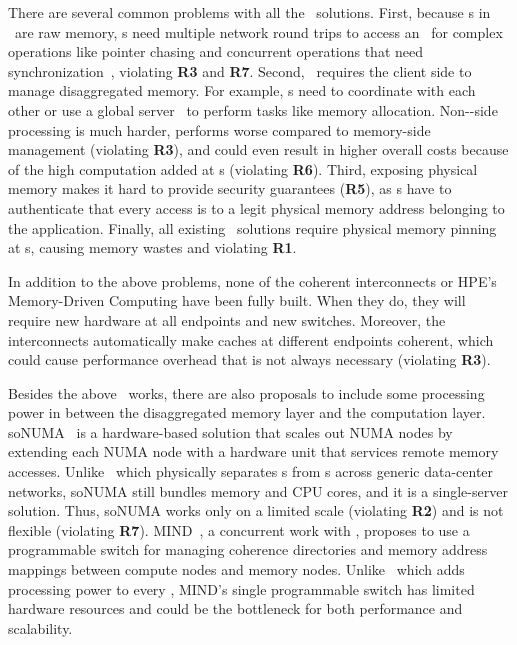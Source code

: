 There are several common problems with all the \pdm\ solutions.
First, because \MN{}s in \pdm\ are raw memory, \CN{}s need multiple network round trips to access an \MN\ 
for complex operations like pointer chasing and concurrent operations that need synchronization~\cite{Tsai20-ATC}, violating \textbf{R3} and \textbf{R7}.
Second, \pdm\ requires the client side to manage disaggregated memory.
For example, \CN{}s need to coordinate with each other or use a global server~\cite{Tsai20-ATC} to perform tasks like memory allocation.
Non-\MN-side processing is much harder, performs worse compared to memory-side management (violating \textbf{R3}), and could even result in higher overall costs because of the high computation added at \CN{}s (violating \textbf{R6}).
Third, exposing physical memory makes it hard to provide security guarantees (\textbf{R5}),
as \MN{}s have to authenticate that every access is to a legit physical memory address belonging to the application.
Finally, all existing \pdm\ solutions require physical memory pinning at \MN{}s, causing memory wastes and violating \textbf{R1}.

In addition to the above problems, none of the coherent interconnects or HPE's Memory-Driven Computing have been fully built.
When they do, they will require new hardware at all endpoints and new switches. 
Moreover, the interconnects automatically make caches at different endpoints coherent, which could cause performance overhead that is not always necessary (violating \textbf{R3}).

Besides the above \pdm\ works, there are also proposals to include some processing power in between the disaggregated memory layer and the computation layer.
soNUMA~\cite{soNUMA} is a hardware-based solution that scales out NUMA nodes by extending each NUMA node with a hardware unit that services remote memory accesses.
Unlike \sys\ which physically separates \MN{}s from \CN{}s across generic data-center networks, soNUMA still bundles memory and CPU cores, and it is a single-server solution.
Thus, soNUMA works only on a limited scale (violating \textbf{R2}) and is not flexible (violating \textbf{R7}).
MIND~\cite{mind:sosp21}, a concurrent work with \sys, proposes to use a programmable switch for managing coherence directories and memory address mappings between compute nodes and memory nodes.
Unlike \sys\ which adds processing power to every \MN, MIND's single programmable switch has limited hardware resources and could be the bottleneck for both performance and scalability.


